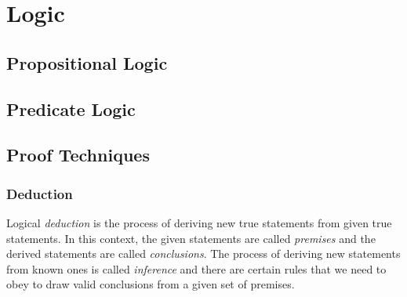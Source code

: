 \chapter{Logic}


\section{Propositional Logic}



\section{Predicate Logic}



\section{Proof Techniques}



\subsection{Deduction}
Logical \emph{deduction} is the process of deriving new true statements from given true statements. In this context, the given statements are called \emph{premises} and the derived statements are called \emph{conclusions}. The process of deriving new statements from known ones is called \emph{inference} and there are certain rules that we need to obey to draw valid conclusions from a given set of premises.



